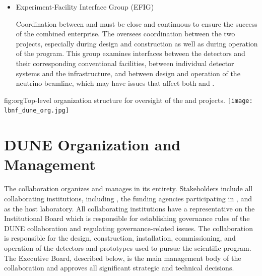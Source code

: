 \begin{itemize}


\item Experiment-Facility Interface Group (EFIG)

Coordination between  and  must be close and continuous to ensure the success of the combined enterprise. The   oversees coordination between the two projects, especially during design and construction as well as during operation of the program.   
This group examines interfaces between the detectors and their corresponding conventional facilities, between individual detector systems and the  infrastructure, and between design and operation of the  neutrino beamline,  which may have issues that affect both  and .  

\end{itemize}

\begin{dunefigure}	
{fig:org}{Top-level organization structure for oversight of the  and  projects.}
\texttt{[image: lbnf\_dune\_org.jpg]}  
\end{dunefigure}

\section{DUNE Organization and Management}

The  collaboration organizes and manages  in its entirety.  Stakeholders include all collaborating institutions, including , the funding agencies participating in , and  as the host laboratory.  All collaborating institutions have a representative on the  Institutional Board which is responsible for establishing governance rules of the DUNE collaboration and regulating governance-related issues. The collaboration is responsible for the design, construction, installation, commissioning, and operation of the detectors and prototypes used to pursue the scientific program. The  Executive Board, described below, is the main management body of the collaboration and approves all significant strategic and technical decisions.

